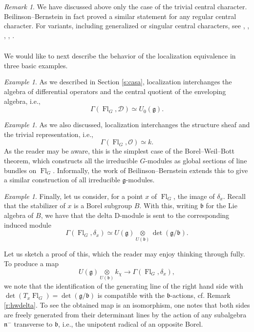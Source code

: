 \documentclass[10pt]{amsart}
\newcommand{\sB}{\on{Fl}_G}
\newcommand{\fg}{\mathfrak{g}}
\newcommand{\on}{\operatorname}
\theoremstyle{remark}
\newtheorem{re}[subsubsection]{Remark}
\newtheorem{ex}[subsubsection]{Example}
\newcommand{\Fl}{\operatorname{Fl}}
\newcommand{\OO}{\mathscr{O}}
\newcommand{\fb}{\mathfrak{b}}
\newcommand{\fn}{\mathfrak{n}}
\newcommand{\sD}{\mathscr{D}}
\numberwithin{equation}{section}
\begin{document}
	
	\begin{re} We have discussed above only the case of the 
	trivial central character. Beilinson--Bernstein in fact proved a similar 
	statement for any regular central character. For variants, including 
	generalized or singular central characters, see \cite{kashloc}, 
	\cite{beilinsonginzburg}, \cite{bmr}, \cite{krem}, \cite{ahc}. \end{re}
	
	
	
	\subsubsection{} We would like to next describe the behavior of the localization equivalence 
	in three basic examples. 
	
	\begin{ex} As we described in Section \ref{s:casa}, localization 
	interchanges the algebra of differential operators and the central quotient 
	of the enveloping algebra, i.e., 
		\[
		\Gamma(\sB, \sD) \simeq U_0(\fg). 
		\]
	\end{ex}
	
	\begin{ex}As we also discussed, localization interchanges the structure 
	sheaf and the trivial representation, i.e., 
		\[
		\Gamma(\sB, \OO) \simeq k. 
		\]
		As the reader may be aware, this is the simplest case of the 
		Borel--Weil--Bott theorem, which constructs all the irreducible 
		$G$-modules as global sections of line bundles on $\sB$. Informally, 
		the work of Beilinson--Bernstein  extends this to give a similar 
		construction of all irreducible $\fg$-modules. 
	\end{ex}
	
	
	\begin{ex} Finally, let us consider, for a point $x$ of $\sB$, the image of 
	$\delta_x$. Recall that the stabilizer of $x$ is a Borel subgroup $B$. 	
	With this, writing $\fb$ for the Lie algebra of $B$, we have that the delta 
	D-module is sent to the corresponding induced module
		\begin{equation}
		\Gamma(\Fl_G, \delta_x) \simeq U(\fg) \underset{U(\fb)} \otimes 
		\det(\fg/\fb).
		\end{equation}
		
		Let us sketch a proof of this, which the reader may enjoy thinking 
		through fully. To produce a map 
		\begin{equation} \label{e:hwv}
		U(\fg) \underset{U(\fb)} \otimes k_{\chi} \rightarrow \Gamma(\Fl_G, 
		\delta_x),
		\end{equation}
		we note that the identification of the generating line of the right hand side 
		with $\det(T_x \sB) = \det( \fg/\fb)$ is compatible with the 
		$\fb$-actions, cf. Remark \ref{r:hwdelta}. To see the obtained map is 
		an isomorphism, one notes that both sides are freely generated from 
		their determinant lines by the action of any subalgebra $\fn^-$ 
		transverse to $\fb$, i.e., the unipotent radical of an opposite Borel. 
	
		
		
	\end{ex}
	
\end{document}
